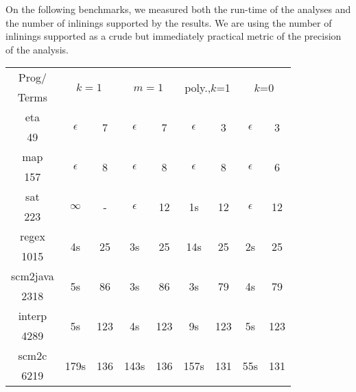 On the following benchmarks, we measured both the run-time of the
analyses and the number of inlinings supported by the results.
We are using the number of inlinings supported as a crude but
immediately practical metric of the precision of the analysis.
\begin{center}
{
\small
\begin{tabular}{|c|cc|cc|cc|cc|}
\hline
\textsf{Prog}/&
  \multicolumn{2}{|c|}{\multirow{2}{*}{\textsf{$k=1$}}} & 
  \multicolumn{2}{|c|}{\multirow{2}{*}{\textsf{$m=1$}}} &
  \multicolumn{2}{|c|}{\multirow{2}{*}{\textsf{poly.,$k$=1}}} &
  \multicolumn{2}{|c|}{\multirow{2}{*}{\textsf{$k$=0}}} \\
\textsf{Terms} & & & & & & & &
\\
\hline
\hline
\textsf{eta}
  & \multirow{2}{*}{$\epsilon$} & \multirow{2}{*}{7} 
  & \multirow{2}{*}{$\epsilon$} & \multirow{2}{*}{7}
  & \multirow{2}{*}{$\epsilon$} & \multirow{2}{*}{3}
  & \multirow{2}{*}{$\epsilon$} & \multirow{2}{*}{3}
\\
\textsf{49} & & & & & & & & \\
\hline
\textsf{map}
  & \multirow{2}{*}{$\epsilon$} & \multirow{2}{*}{8}
  & \multirow{2}{*}{$\epsilon$} & \multirow{2}{*}{8}
  & \multirow{2}{*}{$\epsilon$} & \multirow{2}{*}{8}
  & \multirow{2}{*}{$\epsilon$} & \multirow{2}{*}{6}
\\
\textsf{157} & & & & & & & & \\
\hline
\textsf{sat}
  & \multirow{2}{*}{$\infty$}   & \multirow{2}{*}{-}
  & \multirow{2}{*}{$\epsilon$} &  \multirow{2}{*}{12} 
  & \multirow{2}{*}{1s}         &  \multirow{2}{*}{12}  
  & \multirow{2}{*}{$\epsilon$} & \multirow{2}{*}{12} 
\\
\textsf{223} & & & & & & & & \\
\hline
\textsf{regex}
  & \multirow{2}{*}{4s}  &  \multirow{2}{*}{25}
  & \multirow{2}{*}{3s}  &  \multirow{2}{*}{25}
  & \multirow{2}{*}{14s} &  \multirow{2}{*}{25}
  & \multirow{2}{*}{2s}  &  \multirow{2}{*}{25} 
\\
\textsf{1015} & & & & & & & & \\
\hline
\textsf{scm2java}
  & \multirow{2}{*}{5s} &  \multirow{2}{*}{86}
  & \multirow{2}{*}{3s} &  \multirow{2}{*}{86} 
  & \multirow{2}{*}{3s} &  \multirow{2}{*}{79}
  & \multirow{2}{*}{4s} &  \multirow{2}{*}{79}
\\
\textsf{2318} & & & & & & & & \\
\hline
\textsf{interp}
  & \multirow{2}{*}{5s} &  \multirow{2}{*}{123}
  & \multirow{2}{*}{4s} &  \multirow{2}{*}{123}
  & \multirow{2}{*}{9s} &  \multirow{2}{*}{123}
  & \multirow{2}{*}{5s} &  \multirow{2}{*}{123}
\\
\textsf{4289} & & & & & & & & \\
\hline
\textsf{scm2c}
  & \multirow{2}{*}{179s} &  \multirow{2}{*}{136}
  & \multirow{2}{*}{143s} &  \multirow{2}{*}{136}
  & \multirow{2}{*}{157s} &  \multirow{2}{*}{131}
  & \multirow{2}{*}{55s} &  \multirow{2}{*}{131}
\\
\textsf{6219} & & & & & & & & \\
\hline
\end{tabular}
}
\end{center}
